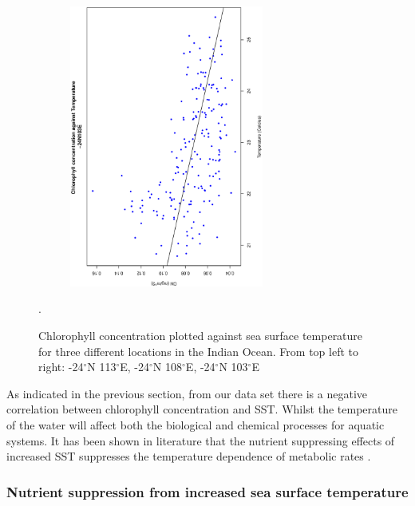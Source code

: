\begin{figure}[ht]
\begin{subfigure}[t]{0.5\textwidth}
    \end{subfigure}
    ~
    \begin{subfigure}[t]{0.5\textwidth}
    \centering
    \includegraphics[width=0.7\textwidth, angle =-90]{Chapter3/-24,103/Data_-24N103E_Regression.eps}
    \end{subfigure}
    \caption{Chlorophyll concentration plotted against sea surface temperature for three different locations in the Indian Ocean. From top left to right: -24$^{\circ}$N 113$^{\circ}$E, -24$^{\circ}$N 108$^{\circ}$E, -24$^{\circ}$N 103$^{\circ}$E}.\label{fig:reg}
\end{figure}

\noindent As indicated in the previous section, from our data set there is a negative correlation between chlorophyll concentration and SST. Whilst the temperature of the water will affect both the biological and chemical processes for aquatic systems. It has been shown in literature that the nutrient suppressing effects of increased SST suppresses the temperature dependence of metabolic rates \cite{maranon2018nutrient}. 

\subsubsection{Nutrient suppression from increased sea surface temperature}

